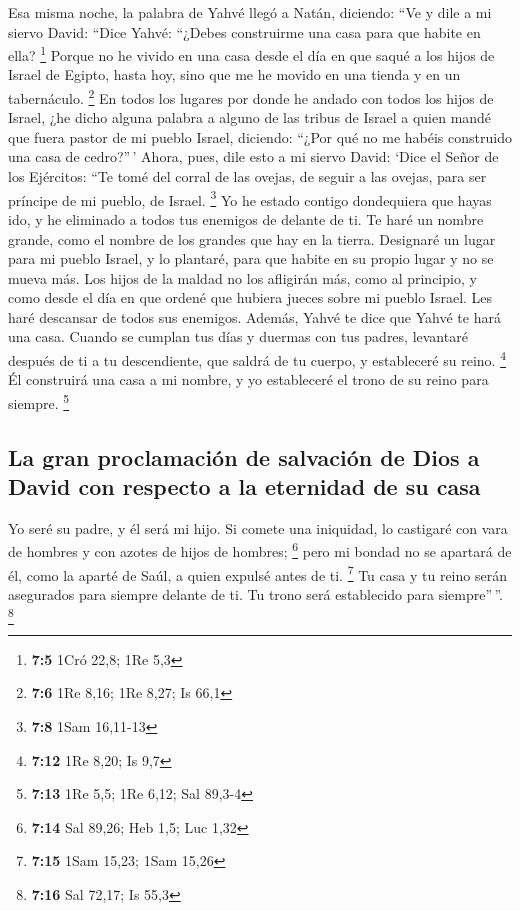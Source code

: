 Esa misma noche, la palabra de Yahvé llegó a Natán,
diciendo:  ``Ve y dile a mi siervo David: ``Dice Yahvé:
``¿Debes construirme una casa para que habite en ella? \footnote{\textbf{7:5}
  1Cró 22,8; 1Re 5,3}  Porque no he vivido en una casa
desde el día en que saqué a los hijos de Israel de Egipto, hasta hoy,
sino que me he movido en una tienda y en un tabernáculo. \footnote{\textbf{7:6}
  1Re 8,16; 1Re 8,27; Is 66,1}  En todos los lugares por
donde he andado con todos los hijos de Israel, ¿he dicho alguna palabra
a alguno de las tribus de Israel a quien mandé que fuera pastor de mi
pueblo Israel, diciendo: ``¿Por qué no me habéis construido una casa de
cedro?''\,'  Ahora, pues, dile esto a mi siervo David:
`Dice el Señor de los Ejércitos: ``Te tomé del corral de las ovejas, de
seguir a las ovejas, para ser príncipe de mi pueblo, de Israel.
\footnote{\textbf{7:8} 1Sam 16,11-13}  Yo he estado
contigo dondequiera que hayas ido, y he eliminado a todos tus enemigos
de delante de ti. Te haré un nombre grande, como el nombre de los
grandes que hay en la tierra.  Designaré un lugar para mi
pueblo Israel, y lo plantaré, para que habite en su propio lugar y no se
mueva más. Los hijos de la maldad no los afligirán más, como al
principio,  y como desde el día en que ordené que hubiera
jueces sobre mi pueblo Israel. Les haré descansar de todos sus enemigos.
Además, Yahvé te dice que Yahvé te hará una casa.  Cuando
se cumplan tus días y duermas con tus padres, levantaré después de ti a
tu descendiente, que saldrá de tu cuerpo, y estableceré su reino.
\footnote{\textbf{7:12} 1Re 8,20; Is 9,7}  Él construirá
una casa a mi nombre, y yo estableceré el trono de su reino para
siempre. \footnote{\textbf{7:13} 1Re 5,5; 1Re 6,12; Sal 89,3-4}

\hypertarget{la-gran-proclamaciuxf3n-de-salvaciuxf3n-de-dios-a-david-con-respecto-a-la-eternidad-de-su-casa}{%
\subsection{La gran proclamación de salvación de Dios a David con
respecto a la eternidad de su
casa}\label{la-gran-proclamaciuxf3n-de-salvaciuxf3n-de-dios-a-david-con-respecto-a-la-eternidad-de-su-casa}}

 Yo seré su padre, y él será mi hijo. Si comete una
iniquidad, lo castigaré con vara de hombres y con azotes de hijos de
hombres; \footnote{\textbf{7:14} Sal 89,26; Heb 1,5; Luc 1,32}
 pero mi bondad no se apartará de él, como la aparté de
Saúl, a quien expulsé antes de ti. \footnote{\textbf{7:15} 1Sam 15,23;
  1Sam 15,26}  Tu casa y tu reino serán asegurados para
siempre delante de ti. Tu trono será establecido para siempre''\,''.
\footnote{\textbf{7:16} Sal 72,17; Is 55,3}

